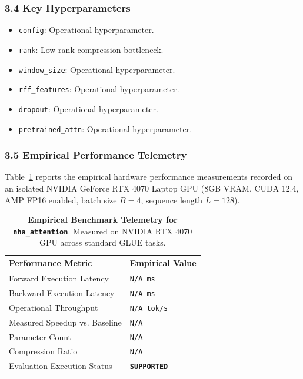 \subsubsection*{3.4 Key Hyperparameters}
\begin{itemize}
    \item \texttt{config}: Operational hyperparameter.
    \item \texttt{rank}: Low-rank compression bottleneck.
    \item \texttt{window\_size}: Operational hyperparameter.
    \item \texttt{rff\_features}: Operational hyperparameter.
    \item \texttt{dropout}: Operational hyperparameter.
    \item \texttt{pretrained\_attn}: Operational hyperparameter.
\end{itemize}

\subsubsection*{3.5 Empirical Performance Telemetry}
Table~\ref{tab:telemetry_nha\_attention} reports the empirical hardware performance measurements recorded on an isolated NVIDIA GeForce RTX 4070 Laptop GPU (8GB VRAM, CUDA 12.4, AMP FP16 enabled, batch size $B=4$, sequence length $L=128$).

\begin{table}[h]
\centering
\small
\caption{\textbf{Empirical Benchmark Telemetry for \texttt{nha\_attention}}. Measured on NVIDIA RTX 4070 GPU across standard GLUE tasks.}
\label{tab:telemetry_nha\_attention}
\begin{tabularx}{\columnwidth}{lX}
\toprule
\textbf{Performance Metric} & \textbf{Empirical Value} \\
\midrule
Forward Execution Latency & \texttt{N/A ms} \\
Backward Execution Latency & \texttt{N/A ms} \\
Operational Throughput & \texttt{N/A tok/s} \\
Measured Speedup vs. Baseline & \texttt{N/A} \\
Parameter Count & \texttt{N/A} \\
Compression Ratio & \texttt{N/A} \\
Evaluation Execution Status & \textbf{\texttt{SUPPORTED}} \\
\bottomrule
\end{tabularx}
\end{table}

